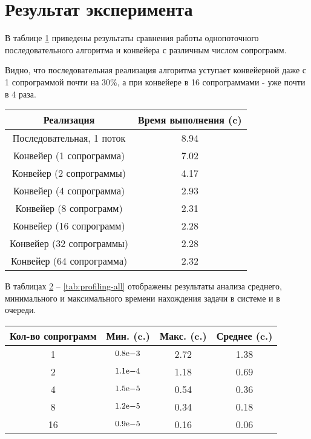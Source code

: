 \section{Результат эксперимента}

В таблице \ref{tab:profiling-1} приведены результаты сравнения работы однопоточного последовательного алгоритма и конвейера с
различным числом сопрограмм.

Видно, что последовательная реализация алгоритма уступает конвейерной даже с 1 сопрограммой почти на 30\%,
 а при конвейере в 16 сопрограммами - уже почти в 4 раза.

\begin{table}[!htb]
	\begin{center}
		\begin{tabular}{|c|c|} 
			\hline
			Реализация & Время выполнения (c)  \\  
			\hline
			Последовательная, 1 поток & 8.94  \\
			\hline
			Конвейер (1 сопрограмма) & 7.02  \\
			\hline
			Конвейер (2 сопрограммы) & 4.17  \\
			\hline
			Конвейер (4 сопрограмма) & 2.93   \\
			\hline
			Конвейер (8 сопрограмм) & 2.31 \\
			\hline
			Конвейер (16 сопрограмм) & 2.28 \\
			\hline
			Конвейер (32 сопрограммы) & 2.28  \\
			\hline
			Конвейер (64 сопрограмма) & 2.32 \\
			\hline
		\end{tabular}
		\label{tab:profiling-1}
	\end{center}
\end{table}

В таблицах \ref{tab:profiling-queue} -- \ref{tab:profiling-all} отображены результаты анализа среднего, минимального 
и максимального времени нахождения задачи в системе и в очереди.



\begin{table}[!ht]
	\begin{center}
		\begin{tabular}{|c|c|c|c|} 
			\hline
			Кол-во сопрограмм & Мин. (c.) & Макс. (c.) & Среднее (c.)  \\  
			\hline
			1 & ${0.8}\mathrm{e}{-3}$ & 2.72 & 1.38 \\
			\hline
			2 & ${1.1}\mathrm{e}{-4}$ & 1.18 & 0.69 \\
			\hline
			4 & ${1.5}\mathrm{e}{-5}$ & 0.54 & 0.36 \\
			\hline
			8 & ${1.2}\mathrm{e}{-5}$ & 0.34 & 0.18 \\
			\hline
			16 & ${0.9}\mathrm{e}{-5}$ & 0.16 & 0.06 \\
			\hline
		\end{tabular}
		\label{tab:profiling-queue}
	\end{center}
\end{table}


